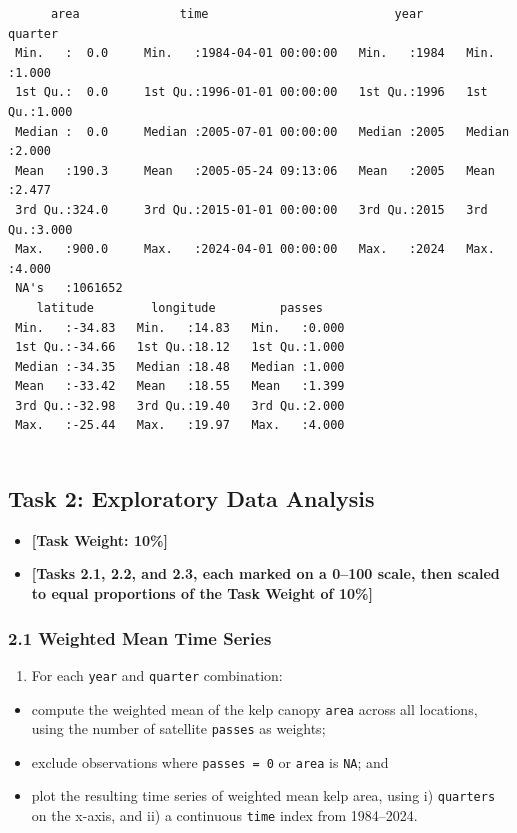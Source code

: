 \documentclass[
  british,
  10pt,
]{article}
\providecommand{\tightlist}{%
  \setlength{\itemsep}{0pt}\setlength{\parskip}{0pt}}
\let\oldtexttt\texttt
\renewcommand{\texttt}[1]{\oldtexttt{\small #1}}
\begin{document}
\begin{verbatim}
      area              time                          year         quarter     
 Min.   :  0.0     Min.   :1984-04-01 00:00:00   Min.   :1984   Min.   :1.000  
 1st Qu.:  0.0     1st Qu.:1996-01-01 00:00:00   1st Qu.:1996   1st Qu.:1.000  
 Median :  0.0     Median :2005-07-01 00:00:00   Median :2005   Median :2.000  
 Mean   :190.3     Mean   :2005-05-24 09:13:06   Mean   :2005   Mean   :2.477  
 3rd Qu.:324.0     3rd Qu.:2015-01-01 00:00:00   3rd Qu.:2015   3rd Qu.:3.000  
 Max.   :900.0     Max.   :2024-04-01 00:00:00   Max.   :2024   Max.   :4.000  
 NA's   :1061652                                                               
    latitude        longitude         passes     
 Min.   :-34.83   Min.   :14.83   Min.   :0.000  
 1st Qu.:-34.66   1st Qu.:18.12   1st Qu.:1.000  
 Median :-34.35   Median :18.48   Median :1.000  
 Mean   :-33.42   Mean   :18.55   Mean   :1.399  
 3rd Qu.:-32.98   3rd Qu.:19.40   3rd Qu.:2.000  
 Max.   :-25.44   Max.   :19.97   Max.   :4.000  
                                                 
\end{verbatim}

\subsection{Task 2: Exploratory Data
Analysis}\label{task-2-exploratory-data-analysis}

\begin{itemize}
\tightlist
\item
  \textbf{{[}Task Weight: 10\%{]}}
\item
  \textbf{{[}Tasks 2.1, 2.2, and 2.3, each marked on a 0--100 scale,
  then scaled to equal proportions of the Task Weight of 10\%{]}}
\end{itemize}

\subsubsection{2.1 Weighted Mean Time
Series}\label{weighted-mean-time-series}

\begin{enumerate}
\def\labelenumi{\arabic{enumi}.}
\tightlist
\item
  For each \texttt{year} and \texttt{quarter} combination:
\end{enumerate}

\begin{itemize}
\tightlist
\item
  compute the weighted mean of the kelp canopy \texttt{area} across all
  locations, using the number of satellite \texttt{passes} as weights;
\item
  exclude observations where \texttt{passes\ =\ 0} or \texttt{area} is
  \texttt{NA}; and
\item
  plot the resulting time series of weighted mean kelp area, using i)
  \texttt{quarters} on the x-axis, and ii) a continuous \texttt{time}
  index from 1984--2024.
\end{itemize}
\end{document}

